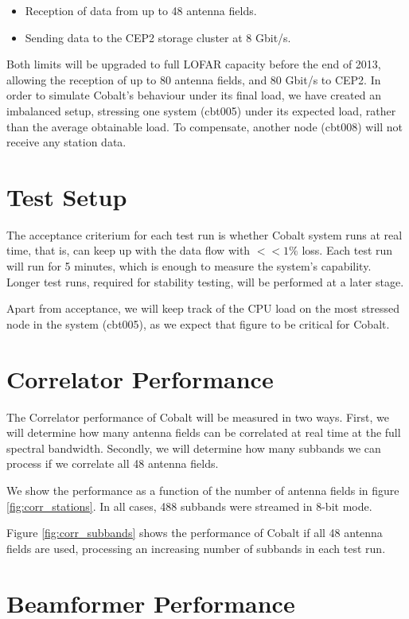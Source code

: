 \documentclass{report}
\begin{document}
\begin{itemize}
\item Reception of data from up to 48 antenna fields.
\item Sending data to the CEP2 storage cluster at 8 Gbit/s.
\end{itemize}

Both limits will be upgraded to full LOFAR capacity before the end of 2013, allowing the reception of up to 80 antenna fields, and 80 Gbit/s to CEP2. In order to simulate Cobalt's behaviour under its final load, we have created an imbalanced setup, stressing one system (cbt005) under its expected load, rather than the average obtainable load. To compensate, another node (cbt008) will not receive any station data.

\section {Test Setup}

The acceptance criterium for each test run is whether Cobalt system runs at real time, that is, can keep up with the data flow with $<<1\%$ loss. Each test run will run for 5 minutes, which is enough to measure the system's capability. Longer test runs, required for stability testing, will be performed at a later stage.

Apart from acceptance, we will keep track of the CPU load on the most stressed node in the system (cbt005), as we expect that figure to be critical for Cobalt.

\section{Correlator Performance}

The Correlator performance of Cobalt will be measured in two ways. First, we will determine how many antenna fields can be correlated at real time at the full spectral bandwidth. Secondly, we will determine how many subbands we can process if we correlate all 48 antenna fields.

We show the performance as a function of the number of antenna fields in figure \ref{fig:corr_stations}. In all cases, 488 subbands were streamed in 8-bit mode.

Figure \ref{fig:corr_subbands} shows the performance of Cobalt if all 48 antenna fields are used, processing an increasing number of subbands in each test run.

\section{Beamformer Performance}
\end{document}
